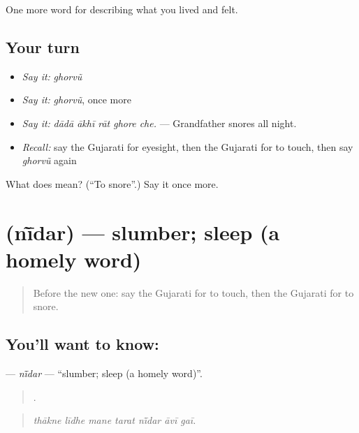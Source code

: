 \begin{grammarlens}[title={What you've built}]
One more word for describing what you lived and felt.
\end{grammarlens}

\subsection*{Your turn}
\begin{itemize}
\raggedright
  \item \emph{Say it:} \emph{ghorvũ}
  \item \emph{Say it:} \emph{ghorvũ}, once more
  \item \emph{Say it:} \emph{dādā ākhī rāt ghore che.} — Grandfather snores all night.
  \item \emph{Recall:} say the Gujarati for eyesight, then the Gujarati for to touch, then say \emph{ghorvũ} again
\end{itemize}

\begin{tcolorbox}[breakable,colback=teal!4,colframe=teal!35!black,title={Before you move on}]
What does  mean? (\textquotedblleft{}To snore\textquotedblright{}.) Say it once more.
\end{tcolorbox}
\section[\texorpdfstring{\gu{નીંદર} (nī̃dar)}{નીંદર (nī̃dar)}]{ (nī̃dar) — slumber; sleep (a homely word)}

\label{lesson:GU-C476-nidar}



\begin{quote}
Before the new one: say the Gujarati for to touch, then the Gujarati for to snore.
\end{quote}

\subsection*{You'll want to know: }
\textbf{} — \emph{nī̃dar} — \textquotedblleft{}slumber; sleep (a homely word)\textquotedblright{}.

\begin{quote}
      .
\end{quote}

\begin{quote}
\emph{thākne līdhe mane tarat nī̃dar āvī gaī.}
\end{quote}


